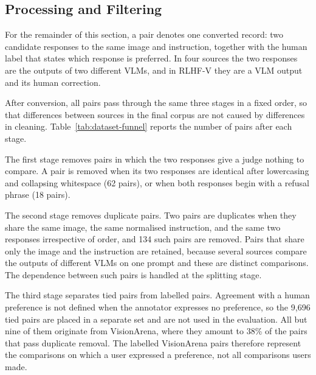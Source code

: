 \documentclass[11pt]{article}
\begin{document}
\subsection{Processing and Filtering}
For the remainder of this section, a pair denotes one converted record: two candidate responses to the same image and instruction, together with the human label that states which response is preferred. In four sources the two responses are the outputs of two different VLMs, and in RLHF-V they are a VLM output and its human correction.

After conversion, all pairs pass through the same three stages in a fixed order, so that differences between sources in the final corpus are not caused by differences in cleaning. Table~\ref{tab:dataset-funnel} reports the number of pairs after each stage.

The first stage removes pairs in which the two responses give a judge nothing to compare. A pair is removed when its two responses are identical after lowercasing and collapsing whitespace (62 pairs), or when both responses begin with a refusal phrase (18 pairs).

The second stage removes duplicate pairs. Two pairs are duplicates when they share the same image, the same normalised instruction, and the same two responses irrespective of order, and 134 such pairs are removed. Pairs that share only the image and the instruction are retained, because several sources compare the outputs of different VLMs on one prompt and these are distinct comparisons. The dependence between such pairs is handled at the splitting stage.

The third stage separates tied pairs from labelled pairs. Agreement with a human preference is not defined when the annotator expresses no preference, so the 9,696 tied pairs are placed in a separate set and are not used in the evaluation. All but nine of them originate from VisionArena, where they amount to 38\% of the pairs that pass duplicate removal. The labelled VisionArena pairs therefore represent the comparisons on which a user expressed a preference, not all comparisons users made.
\end{document}
